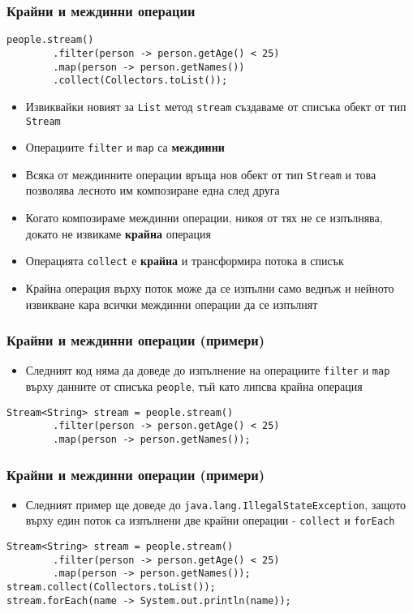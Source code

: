 \documentclass[ignorenonframetext, hyperref=unicode,compress,pdflatex]{beamer}
\begin{document}
\begin{frame}[containsverbatim]\frametitle{Крайни и междинни операции}
\begin{lstlisting}
people.stream()
		.filter(person -> person.getAge() < 25)
		.map(person -> person.getNames())
		.collect(Collectors.toList());
\end{lstlisting}
\begin{itemize}
  \item Извиквайки новият за \lstinline{List} метод \lstinline{stream} създаваме
  от списъка обект от тип \lstinline{Stream}
  \item Операциите \lstinline{filter} и \lstinline{map} са \textbf{междинни}
  \item Всяка от междинните операции връща нов обект от тип \lstinline{Stream} и
  това позволява лесното им композиране една след друга
  \item Когато композираме междинни операции, никоя от тях не се изпълнява,
  докато не извикаме \textbf{крайна} операция
  \item Операцията \lstinline{collect} е \textbf{крайна} и трансформира потока в
  списък
  \item Крайна операция върху поток може да се изпълни само веднъж и нейното
  извикване кара всички междинни операции да се изпълнят
\end{itemize}
\end{frame}

\begin{frame}[containsverbatim]\frametitle{Крайни и междинни операции (примери)}
\begin{itemize}
  \item Следният код няма да доведе до изпълнение на операциите
  \lstinline{filter} и \lstinline{map} върху данните от списъка
  \lstinline{people}, тъй като липсва крайна операция
\end{itemize}
\begin{lstlisting}
Stream<String> stream = people.stream()
		.filter(person -> person.getAge() < 25)
		.map(person -> person.getNames());
\end{lstlisting}
\end{frame}

\begin{frame}[containsverbatim]\frametitle{Крайни и междинни операции (примери)}
\begin{itemize}
  \item Следният пример ще доведе до
  \lstinline{java.lang.IllegalStateException}, защото върху един поток са
  изпълнени две крайни операции - \lstinline{collect} и \lstinline{forEach}
\end{itemize}
\begin{lstlisting}
Stream<String> stream = people.stream()
		.filter(person -> person.getAge() < 25)
		.map(person -> person.getNames());
stream.collect(Collectors.toList());
stream.forEach(name -> System.out.println(name));\end{lstlisting}
\end{frame}
\end{document}
